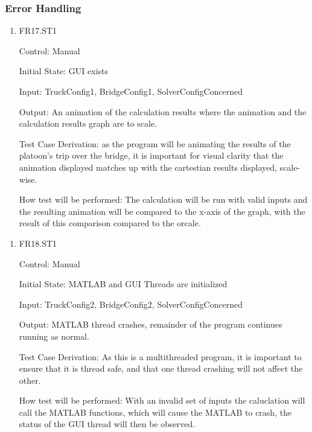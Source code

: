 \documentclass[12pt, titlepage]{article}
\begin{document}
\subsubsection{Error Handling}
\begin{enumerate}

  \item{FR17.ST1\\}
  
  Control: Manual
            
  Initial State: GUI exists
            
  Input: TruckConfig1, BridgeConfig1, SolverConfigConcerned
            
  Output: An animation of the calculation results where the animation and the calculation results graph are to scale.
  
  Test Case Derivation: as the program will be animating the results of the platoon's trip over the bridge, it is important for visual clarity that the animation displayed matches up with the cartestian results displayed, scale-wise.
  
  How test will be performed: The calculation will be run with valid inputs and the resulting animation will be compared to the x-axis of the graph, with the result of this comparison compared to the orcale.
\end{enumerate}
\begin{enumerate}
  \item{FR18.ST1\\}
  
  Control: Manual
            
  Initial State: MATLAB and GUI Threads are initialized
            
  Input: TruckConfig2, BridgeConfig2, SolverConfigConcerned
            
  Output: MATLAB thread crashes, remainder of the program continues running as normal. 
  
  Test Case Derivation: As this is a multithreaded program, it is important to ensure that it is thread safe, and that one thread crashing will not affect the other.
  
  How test will be performed: With an invalid set of inputs the caluclation will call the MATLAB functions, which will cause the MATLAB to crash, the status of the GUI thread will then be observed.
              
\end{enumerate}
\end{document}
